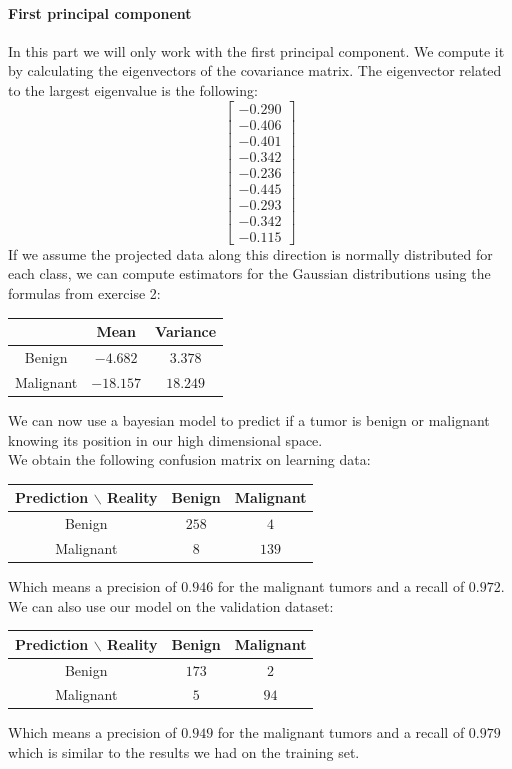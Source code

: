 \documentclass[a4paper, 10pt]{article}
\begin{document}
\paragraph{First principal component}
In this part we will only work with the first principal component. We compute it by calculating the
eigenvectors of the covariance matrix. The eigenvector related to the largest eigenvalue is the following:
$$
\begin{bmatrix}
    -0.290\\
    -0.406\\
    -0.401\\
    -0.342\\
    -0.236\\
    -0.445\\
    -0.293\\
    -0.342\\
    -0.115
\end{bmatrix}
$$
If we assume the projected data along this direction is normally distributed for each class, we can compute
estimators for the Gaussian distributions using the formulas from exercise 2:
\begin{center}
    \begin{tabular}{ |c|c|c| }
        \hline
        \ & Mean & Variance \\
        \hline
        Benign & $-4.682$ & $3.378$ \\
        \hline
        Malignant & $-18.157$ & $18.249$ \\ 
        \hline
    \end{tabular}
\end{center}
We can now use a bayesian model to predict if a tumor is benign or malignant knowing its position in our high dimensional space.
\\
We obtain the following confusion matrix on learning data:
\begin{center}
    \begin{tabular}{ |c|c|c| }
        \hline
        Prediction $\backslash$ Reality & Benign & Malignant \\
        \hline
        Benign & $258$ & $4$ \\
        \hline
        Malignant & $8$ & $139$ \\ 
        \hline
    \end{tabular}
\end{center}
Which means a precision of $0.946$ for the malignant tumors and a recall of $0.972$.
\\
We can also use our model on the validation dataset:
\begin{center}
    \begin{tabular}{ |c|c|c| }
        \hline
        Prediction $\backslash$ Reality & Benign & Malignant \\
        \hline
        Benign & $173$ & $2$ \\
        \hline
        Malignant & $5$ & $94$ \\ 
        \hline
    \end{tabular}
\end{center}
Which means a precision of $0.949$ for the malignant tumors and a recall of $0.979$ which is similar to
the results we had on the training set.
\end{document}
